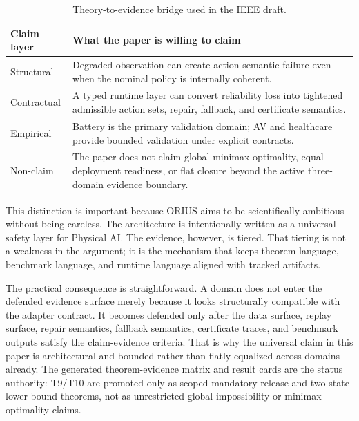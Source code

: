 \begin{table}[t]
\centering
\caption{Theory-to-evidence bridge used in the IEEE draft.}
\label{tab:ieee-theory-bridge}
\small
\begin{tabularx}{\columnwidth}{@{}p{}X@{}}
\toprule
\textbf{Claim layer} & \textbf{What the paper is willing to claim}\\
\midrule
Structural & Degraded observation can create action-semantic failure even when the nominal policy is internally coherent.\\
Contractual & A typed runtime layer can convert reliability loss into tightened admissible action sets, repair, fallback, and certificate semantics.\\
Empirical & Battery is the primary validation domain; AV and healthcare provide bounded validation under explicit contracts.\\
Non-claim & The paper does not claim global minimax optimality, equal deployment readiness, or flat closure beyond the active three-domain evidence boundary.\\
\bottomrule
\end{tabularx}
\end{table}

This distinction is important because ORIUS aims to be scientifically ambitious without
being careless. The architecture is intentionally written as a universal safety layer
for Physical AI. The evidence, however, is tiered. That tiering is not a weakness in
the argument; it is the mechanism that keeps theorem language, benchmark language, and
runtime language aligned with tracked artifacts.

The practical consequence is straightforward. A domain does not enter the defended
evidence surface merely because it looks structurally compatible with the adapter
contract. It becomes defended only after the data surface, replay surface, repair
semantics, fallback semantics, certificate traces, and benchmark outputs satisfy the
claim-evidence criteria. That is
why the universal claim in this paper is architectural and bounded rather than flatly
equalized across domains already. The generated theorem-evidence matrix and
result cards are the status authority: T9/T10 are promoted only as scoped
mandatory-release and two-state lower-bound theorems, not as unrestricted
global impossibility or minimax-optimality claims.
